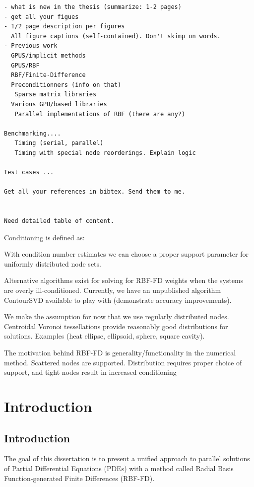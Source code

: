 
\begin{verbatim}
- what is new in the thesis (summarize: 1-2 pages)
- get all your figues
- 1/2 page description per figures
  All figure captions (self-contained). Don't skimp on words.
- Previous work
  GPUS/implicit methods
  GPUS/RBF
  RBF/Finite-Difference
  Preconditionners (info on that)
   Sparse matrix libraries
  Various GPU/based libraries
   Parallel implementations of RBF (there are any?)

Benchmarking....
   Timing (serial, parallel)
   Timing with special node reorderings. Explain logic

Test cases ...

Get all your references in bibtex. Send them to me.


Need detailed table of content.
\end{verbatim}

Conditioning is defined as: 

With condition number estimates we can choose a proper support parameter for uniformly distributed node sets.

Alternative algorithms exist for solving for RBF-FD weights when the systems are overly ill-conditioned. Currently, we have an unpublished algorithm ContourSVD available to play with (demonstrate accuracy improvements). 

We make the assumption for now that we use regularly distributed nodes. Centroidal Voronoi tessellations provide reasonably good distributions for solutions. Examples (heat ellipse, ellipsoid, sphere, square cavity).

The motivation behind RBF-FD is generality/functionality in the numerical method. Scattered nodes are supported. Distribution requires proper choice of support, and tight nodes result in increased conditioning


\chapter{Introduction}

\section{Introduction}
\label{sec:intro}

The goal of this dissertation is to present a unified approach
to parallel solutions of Partial Differential Equations (PDEs)
with a method called Radial Basis Function-generated Finite
Differences (RBF-FD).

